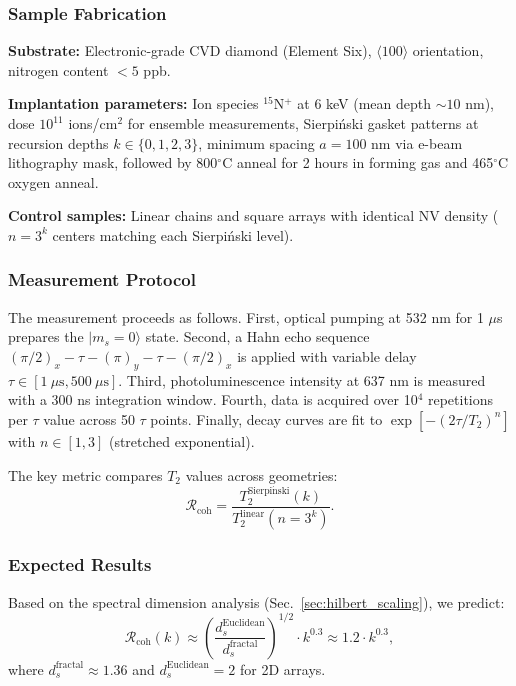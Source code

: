 \subsubsection{Sample Fabrication}

\textbf{Substrate:} Electronic-grade CVD diamond (Element Six), $\langle 100 \rangle$ orientation, nitrogen content $< 5$ ppb.

\textbf{Implantation parameters:} Ion species $^{15}$N$^+$ at 6 keV (mean depth $\sim 10$ nm), dose $10^{11}$ ions/cm$^2$ for ensemble measurements, Sierpi\'{n}ski gasket patterns at recursion depths $k \in \{0, 1, 2, 3\}$, minimum spacing $a = 100$ nm via e-beam lithography mask, followed by 800$^\circ$C anneal for 2 hours in forming gas and 465$^\circ$C oxygen anneal.

\textbf{Control samples:} Linear chains and square arrays with identical NV density ($n = 3^k$ centers matching each Sierpi\'{n}ski level).

\subsubsection{Measurement Protocol}

The measurement proceeds as follows. First, optical pumping at 532 nm for 1 $\mu$s prepares the $|m_s = 0\rangle$ state. Second, a Hahn echo sequence $(\pi/2)_x - \tau - (\pi)_y - \tau - (\pi/2)_x$ is applied with variable delay $\tau \in [1~\mu\text{s}, 500~\mu\text{s}]$. Third, photoluminescence intensity at 637 nm is measured with a 300 ns integration window. Fourth, data is acquired over 10$^4$ repetitions per $\tau$ value across 50 $\tau$ points. Finally, decay curves are fit to $\exp[-(2\tau/T_2)^n]$ with $n \in [1, 3]$ (stretched exponential).

The key metric compares $T_2$ values across geometries:
\begin{equation}
\mathcal{R}_{\mathrm{coh}} = \frac{T_2^{\mathrm{Sierpi\acute{n}ski}}(k)}{T_2^{\mathrm{linear}}(n=3^k)}.
\label{eq:coherence_ratio}
\end{equation}

\subsubsection{Expected Results}

Based on the spectral dimension analysis (Sec.~\ref{sec:hilbert_scaling}), we predict:
\begin{equation}
\mathcal{R}_{\mathrm{coh}}(k) \approx \left( \frac{d_s^{\mathrm{Euclidean}}}{d_s^{\mathrm{fractal}}} \right)^{1/2} \cdot k^{0.3} \approx 1.2 \cdot k^{0.3},
\end{equation}
where $d_s^{\mathrm{fractal}} \approx 1.36$ and $d_s^{\mathrm{Euclidean}} = 2$ for 2D arrays.


